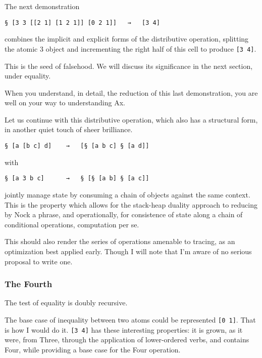 \documentclass[twoside]{article}
\begin{document}
The next demonstration

\begin{lstlisting}[style=listingcode]
§ [3 3 [[2 1] [1 2 1]] [0 2 1]]   →   [3 4]
\end{lstlisting}

\noindent
combines the implicit and explicit forms of the distributive operation, splitting the atomic 3 object and incrementing the right half of this cell to produce \lstinline[style=inlinecode]{[3 4]}.

This is the seed of falsehood.  We will discuss its significance in the next section, under equality.

When you understand, in detail, the reduction of this last demonstration, you are well on your way to understanding Ax.

Let us continue with this distributive operation, which also has a structural form, in another quiet touch of sheer brilliance.

\begin{lstlisting}[style=listingcode]
§ [a [b c] d]    →   [§ [a b c] § [a d]]
\end{lstlisting}

\noindent
with

\begin{lstlisting}[style=listingcode]
§ [a 3 b c]      →   § [§ [a b] § [a c]]
\end{lstlisting}

\noindent
jointly manage state by consuming a chain of objects against the same context. This is the property which allows for the stack-heap duality approach to reducing by Nock a phrase, and operationally, for consistence of state along a chain of conditional operations, computation per se.

This should also render the series of operations amenable to tracing, as an optimization best applied early. Though I will note that I'm aware of no serious proposal to write one.

\subsubsection{The Fourth}

The test of equality is doubly recursive.

The base case of inequality between two atoms could be represented \lstinline[style=inlinecode]{[0 1]}.  That is how I would do it.  \lstinline[style=inlinecode]{[3 4]} has these interesting properties: it is grown, as it were, from Three, through the application of lower-ordered verbs, and contains Four, while providing a base case for the Four operation.
\end{document}

